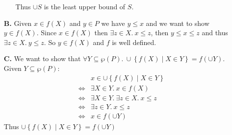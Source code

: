 \begin{exercise}
\begin{enumerate}
\begin{itemize}
                    Thus $\cup S$ is the least upper bound of $S$.
            \end{itemize}
        \item[\textbf{B.}]
            Given $x \in f(X)$ and $y \in P$ we have $y \leq x$ and we want to show $y \in f(X)$. Since $x \in f(X)$ then $\exists z \in X.\ x \leq z$, then $y \leq x \leq z$ and thus $\exists z \in X.\ y \leq z$. So $y \in f(X)$ and $f$ is well defined.
        \item[\textbf{C.}]
            We want to show that $\forall Y \subseteq \wp(P).\ \cup \left\{f(X) \mid X \in Y\right\} = f(\cup Y)$. Given $Y \subseteq \wp(P)$:
            \begin{align*}
                &x \in \cup \left\{f(X) \mid X \in Y\right\} \\
                \iff& \exists X \in Y.\ x \in f(X) \\
                \iff& \exists X \in Y.\ \exists z \in X.\ x \leq z \\
                \iff& \exists z \in Y.\ x \leq z \\
                \iff& x \in f(\cup Y)
            \end{align*}
            Thus $\cup \left\{f(X) \mid X \in Y\right\} = f(\cup Y)$
    \end{enumerate}
\end{exercise}
